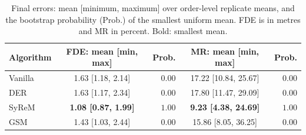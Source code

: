 \begin{table}[!t]
\centering
\caption{Final errors: mean [minimum, maximum] over order-level replicate means, and the bootstrap probability (Prob.) of the smallest uniform mean. FDE is in metres and MR in percent. Bold: smallest mean.}
\label{tab:final_error}
\setlength{\tabcolsep}{3pt}
\footnotesize
\begin{tabular*}{\columnwidth}{@{\extracolsep{\fill}}lcrcr@{}}
\toprule
Algorithm & FDE: mean [min, max] & Prob. & MR: mean [min, max] & Prob. \\
\midrule
Vanilla & 1.63 [1.18, 2.14] & $0.00$ & 17.22 [10.84, 25.67] & $0.00$ \\
DER & 1.63 [1.17, 2.34] & $0.00$ & 17.80 [11.47, 29.09] & $0.00$ \\
SyReM & \textbf{1.08 [0.87, 1.99]} & $1.00$ & \textbf{9.23 [4.38, 24.69]} & $1.00$ \\
GSM & 1.43 [1.03, 2.44] & $0.00$ & 15.86 [8.05, 36.25] & $0.00$ \\
\bottomrule
\end{tabular*}
\end{table}

